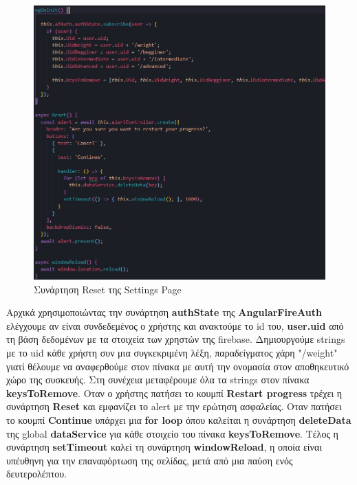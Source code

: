 \documentclass[a4paper,12pt]{article}
\begin{document}
		\begin{figure}[!htb]
			\begin{center}
				\caption{Συνάρτηση Reset της Settings Page}
				\vspace*{0.5cm}
				\includegraphics[width=.9\linewidth]{settings2} 
			\end{center}  	
		\end{figure}
		\vspace*{0.5cm}

		Αρχικά χρησιμοποιώντας την συνάρτηση \textbf{authState } της \textbf{AngularFireAuth} ελέγχουμε αν είναι συνδεδεμένος ο χρήστης και ανακτούμε το id του, 
		\textbf{user.uid} από τη βάση δεδομένων με τα στοιχεία των χρηστών της firebase. Δημιουργούμε strings με το uid κάθε χρήστη συν μια συγκεκριμένη λέξη, παραδείγματος 
		χάρη "/weight" γιατί θέλουμε να αναφερθούμε στον πίνακα με αυτή την ονομασία στον αποθηκευτικό χώρο της συσκευής. Στη συνέχεια μεταφέρουμε όλα τα strings στον
		πίνακα \textbf{keysToRemove}. Οταν ο χρήστης πατήσει το κουμπί \textbf{Restart progress} τρέχει η συνάρτηση \textbf{Reset} και εμφανίζει το alert με την ερώτηση 
		ασφαλείας. Οταν πατήσει το κουμπί \textbf{Continue} υπάρχει μια \textbf{for loop} όπου καλείται η συνάρτηση \textbf{deleteData} της global \textbf{dataService} 
		για κάθε στοιχείο του πίνακα \textbf{keysToRemove}. Τέλος η συνάρτηση \textbf{setTimeout} καλεί τη συνάρτηση \textbf{windowReload}, η οποία είναι υπέυθηνη για την 
		επαναφόρτωση της σελίδας, μετά από μια παύση ενός δευτερολέπτου.  
\end{document}
